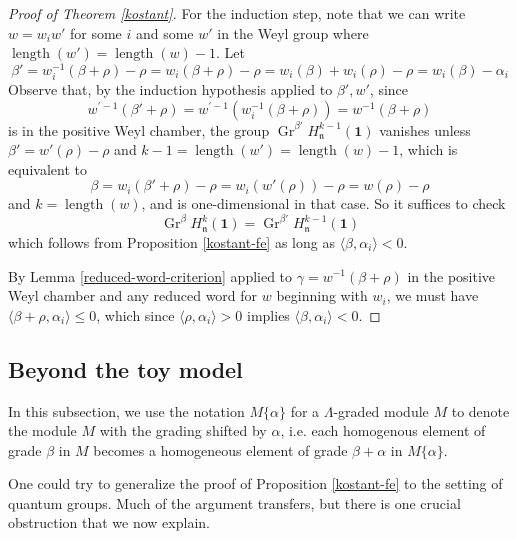 \documentclass[11pt,letterpaper]{article}
\theoremstyle{definition}
\theoremstyle{remark}
\numberwithin{equation}{section}
\theoremstyle{dotless}
\newcommand{\Gr}{\operatorname{Gr}}
\newcommand{\LieH}{H}
\begin{document}
\begin{proof}[Proof of Theorem \ref{kostant}]
 
For the induction step, note that we can write $w= w_i w'$ for some $i$ and some $w'$ in the Weyl group where $\operatorname{length} (w') = \operatorname{length}(w)-1$. Let
\[\beta' = w_i^{-1} (\beta+\rho) - \rho= w_i(\beta+\rho)-\rho =w_i(\beta) + w_i(\rho) - \rho= w_i (\beta)-\alpha_i\]
Observe that, by the induction hypothesis applied to $\beta', w'$, since \[w^{'-1} ( \beta'+\rho) = w^{'-1} ( w_i^{-1} (\beta+\rho) ) = w^{-1} (\beta+\rho) \] is in the positive Weyl chamber, the group $\Gr^{\beta'}  \LieH^{k-1}_{\mathfrak n} ( \mathbf 1) $ vanishes unless $\beta'= w'(\rho)-\rho$ and $k-1= \operatorname{length}(w')= \operatorname{length}(w)-1 $, which is equivalent to \[ \beta= w_i(\beta'+\rho) - \rho= w_i ( w'(\rho))-\rho= w(\rho)-\rho\] and $k= \operatorname{length}(w)$, and is one-dimensional in that case. So it suffices to check
\[\Gr^\beta  \LieH^{k}_{\mathfrak n} ( \mathbf 1)  = \Gr^{\beta'} \LieH^{k-1}_{\mathfrak n} ( \mathbf 1) \]
which follows from Proposition \ref{kostant-fe} as long as $\langle \beta, \alpha_i \rangle <0$.

By Lemma \ref{reduced-word-criterion} applied to $\gamma = w^{-1} (\beta+\rho) $ in the positive Weyl chamber and any reduced word for $w$ beginning with $w_i$,  we must have $\langle \beta +\rho, \alpha_i \rangle \leq 0$, which since $\langle \rho,\alpha_i \rangle >0$ implies $\langle \beta, \alpha_i \rangle <0$. \end{proof}


\subsection{Beyond the toy model}\label{ss:Hopf}

In this subsection, we use the notation $M \{\alpha\}$ for a $\Lambda$-graded module $M$ to denote the module $M$ with the grading shifted by $\alpha$, i.e. each homogenous element of grade $\beta$ in $M$ becomes a homogeneous element of grade $\beta+\alpha$ in $M\{\alpha\}$.

One could try to generalize the proof of Proposition \ref{kostant-fe} to the setting of quantum groups. Much of the argument transfers, but there is one crucial obstruction that we now explain.
\end{document}
